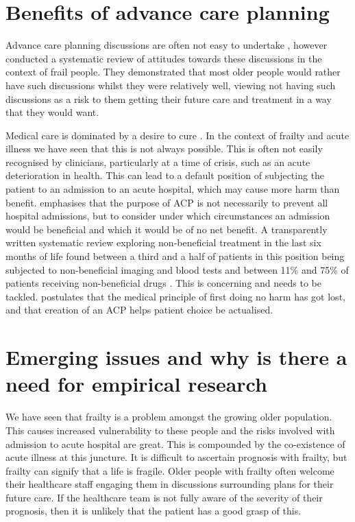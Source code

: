 \documentclass
[
	12pt,
	a4paper,
	oneside,
]{report}
\begin{document}
\section{Benefits of advance care planning}

Advance care planning discussions are often not easy to undertake 
\parencite{taylor:17}, however \textcite{sharp:13} conducted a systematic
review of attitudes towards these discussions in the context of frail people. 
They demonstrated that most older people would rather have such discussions
whilst they were relatively well, viewing not having such discussions
as a risk to them getting their future care and treatment in a way
that they would want.

Medical care is dominated by a desire to cure \parencite{taylor:17}. In the 
context of frailty and acute illness we have seen that this is not always 
possible. This is often not easily recognised by clinicians, particularly
at a time of crisis, such as an acute deterioration in health. This can lead
to a default position of subjecting the patient to an admission to an acute
hospital, which may cause more harm than benefit. 
\textcite{waird:16} emphasises that the purpose of ACP is not necessarily
to prevent all hospital admissions, but to consider under which 
circumstances an admission would be beneficial and which it would be of
no net benefit. A transparently written 
systematic review exploring non-beneficial treatment in the last six months
of life found between a third and a half of patients in this position being
subjected to non-beneficial imaging and blood tests and between 11\% and
75\% of patients receiving non-beneficial drugs \parencite{cardona:16}.
This is concerning and needs to be tackled. \textcite{taylor:17} postulates
that the medical principle of first doing no harm has got lost, and that
creation of an ACP helps patient choice be actualised.

\section{Emerging issues and why is there a need for empirical 
research}

We have seen that frailty is a problem amongst the growing older population.
This causes increased vulnerability to these people and the risks involved with 
admission to acute hospital are great. This is compounded by the co-existence
of acute illness at this juncture. It is difficult to ascertain prognosis with 
frailty, but frailty can signify that a life is fragile. Older people with 
frailty often welcome their healthcare staff engaging them in discussions 
surrounding plans for their future care. If the healthcare team is not fully
aware of the severity of their prognosis, then it is unlikely that the patient
has a good grasp of this. 
\end{document}
